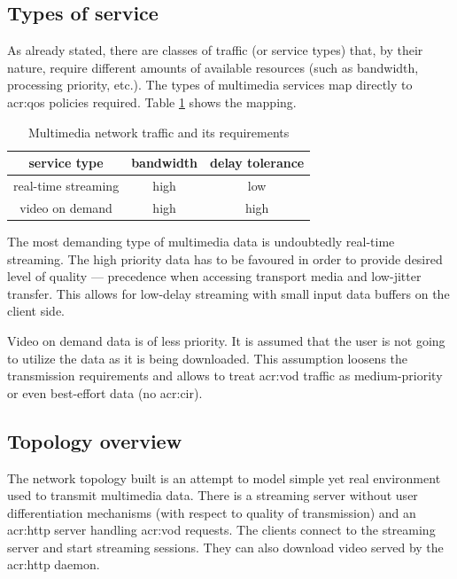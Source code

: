 \documentclass[11pt,openany]{book}
\begin{document}
      \subsection{Types of service}
      
        As already stated, there are classes of traffic (or service types) that, by their nature, require different
        amounts of available resources (such as bandwidth, processing priority, etc.). The types of multimedia services
        map directly to \gls{acr:qos} policies required. Table \ref{tab:uc:qos} shows the mapping.

        \begin{table}[H]
          \begin{center}
            \begin{tabular}{|c|c|c|}
              \hline
              service type        & bandwidth & delay tolerance \\
              \hline \hline
              real-time streaming & high      & low             \\
              \hline
              video on demand     & high      & high            \\
              \hline
            \end{tabular}
          \end{center}

          \caption{Multimedia network traffic and its requirements}
          \label{tab:uc:qos}
        \end{table}

        The most demanding type of multimedia data is undoubtedly real-time streaming. The high priority data has to be
        favoured in order to provide desired level of quality --- precedence when accessing transport media and
        low-jitter transfer. This allows for low-delay streaming with small input data buffers on the client side.

        Video on demand data is of less priority. It is assumed that the user is not going to utilize the data as it is
        being downloaded. This assumption loosens the transmission requirements and allows to treat \gls{acr:vod}
        traffic as medium-priority or even best-effort data (no \gls{acr:cir}).


      \subsection{Topology overview}

        The network topology built is an attempt to model simple yet real environment used to transmit multimedia data.
        There is a streaming server without user differentiation mechanisms (with respect to quality of transmission)
        and an \gls{acr:http} server handling \gls{acr:vod} requests. The clients connect to the streaming server and
        start streaming sessions. They can also download video served by the \gls{acr:http} daemon.
\end{document}
